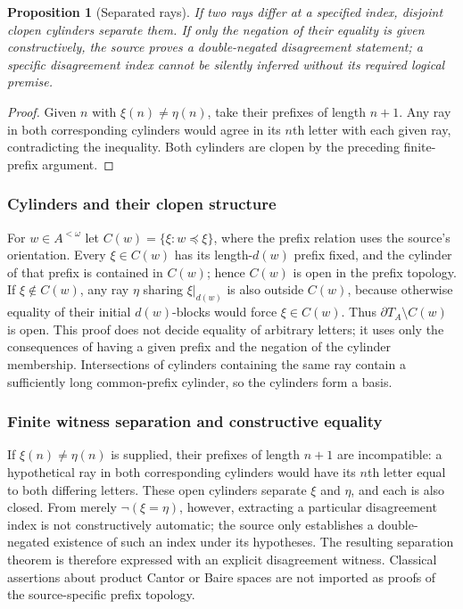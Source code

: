 \documentclass[11pt,reqno]{amsart}
\newtheorem{proposition}[theorem]{Proposition}
\theoremstyle{definition}\newtheorem{definition}[theorem]{Definition}
\theoremstyle{remark}\newtheorem{remark}[theorem]{Remark}
\newcommand{\rays}{\partial T}
\begin{document}
\begin{proposition}[Separated rays]\label{prop:separate}
If two rays differ at a specified index, disjoint clopen cylinders separate them. If only the negation of their equality is given constructively, the source proves a double-negated disagreement statement; a specific disagreement index cannot be silently inferred without its required logical premise.
\end{proposition}
\begin{proof}
Given $n$ with $\xi(n)\ne\eta(n)$, take their prefixes of length $n+1$. Any ray in both corresponding cylinders would agree in its $n$th letter with each given ray, contradicting the inequality. Both cylinders are clopen by the preceding finite-prefix argument.
\end{proof}


\medskip
\subsubsection*{Cylinders and their clopen structure}\label{supp:10-3}
For $w\in A^{<\omega}$ let $C(w)=\{\xi:w\preceq\xi\}$, where the prefix relation uses the source's orientation. Every $\xi\in C(w)$ has its length-$d(w)$ prefix fixed, and the cylinder of that prefix is contained in $C(w)$; hence $C(w)$ is open in the prefix topology. If $\xi\notin C(w)$, any ray $\eta$ sharing $\xi|_{d(w)}$ is also outside $C(w)$, because otherwise equality of their initial $d(w)$-blocks would force $\xi\in C(w)$. Thus $\rays_A\setminus C(w)$ is open. This proof does not decide equality of arbitrary letters; it uses only the consequences of having a given prefix and the negation of the cylinder membership. Intersections of cylinders containing the same ray contain a sufficiently long common-prefix cylinder, so the cylinders form a basis.
\medskip
\medskip
\subsubsection*{Finite witness separation and constructive equality}\label{supp:10-4}
If $\xi(n)\ne\eta(n)$ is supplied, their prefixes of length $n+1$ are incompatible: a hypothetical ray in both corresponding cylinders would have its $n$th letter equal to both differing letters. These open cylinders separate $\xi$ and $\eta$, and each is also closed. From merely $\neg(\xi=\eta)$, however, extracting a particular disagreement index is not constructively automatic; the source only establishes a double-negated existence of such an index under its hypotheses. The resulting separation theorem is therefore expressed with an explicit disagreement witness. Classical assertions about product Cantor or Baire spaces are not imported as proofs of the source-specific prefix topology.
\medskip
\end{document}
